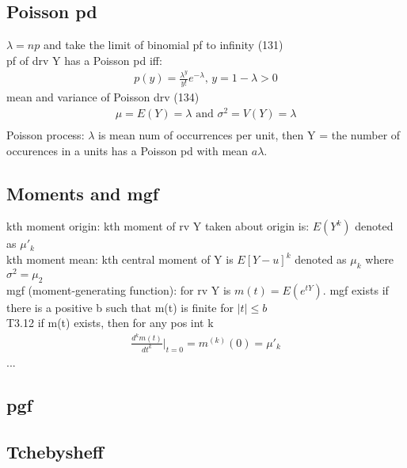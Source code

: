 \documentclass[12pt]{article}
\begin{document}
	\subsection{Poisson pd}
		$ \lambda = np $ and take the limit of binomial pf to infinity (131)\\
		pf of drv Y has a Poisson pd iff:
		\begin{align*}
			p(y) = \frac{\lambda^y}{y!}e^{-\lambda} \text{,   }
			y=1-\lambda > 0
		\end{align*}
		mean and variance of Poisson drv (134)
		\begin{align*}
			\mu = E(Y) = \lambda \text{ and }
			\sigma^2 = V(Y) = \lambda \\
		\end{align*}
		Poisson process: $ \lambda $ is mean num of occurrences per unit, then
		Y = the number of occurences in a units has a Poisson pd with
		mean $ a\lambda $. 
	\subsection{Moments and mgf}
		kth moment origin: kth moment of rv Y taken about origin is: $ E(Y^k) $
		denoted as $ \mu'_k $ \\
		kth moment mean: kth central moment of Y is $ E[Y-u]^k $
		denoted as $ \mu_k $ where $ \sigma^2 = \mu_2 $ \\
		mgf (moment-generating function): for rv Y is
		$ m(t) = E(e^{tY}) $. mgf exists if there is a positive b such that
		m(t) is finite for $ |t| \le b $ \\
		T3.12 if m(t) exists, then for any pos int k
		\begin{align*}
			\frac{d^km(t)}{dt^k}|_{t=0} =
			m^{(k)}(0) = \mu'_k
		\end{align*}
		...
	\subsection{pgf}
	\subsection{Tchebysheff}
\end{document}
